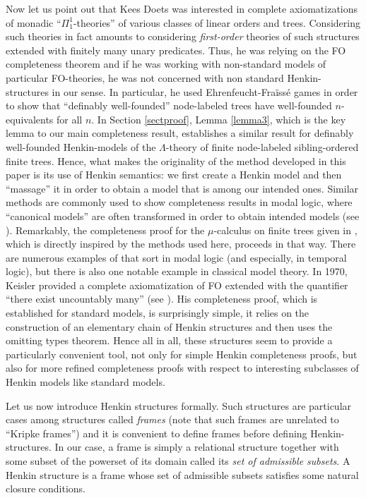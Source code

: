 \documentclass{LMCS}
\newcommand{\fo}{\textsf{FO}\xspace}
\begin{document}
Now let us point out that Kees Doets was interested in complete axiomatizations of monadic ``$\Pi_1^1$-theories'' of various classes of
linear orders and trees. Considering such theories in fact amounts to considering \emph{first-order} theories of such structures extended with finitely many unary predicates. Thus, he was relying on the \fo completeness theorem and if he was working with non-standard models of particular \fo-theories, he was not concerned with non standard Henkin-structures in our sense. In particular, he used Ehrenfeucht-Fra\"{i}ss\'{e} games in order to show that ``definably well-founded'' node-labeled trees have well-founded $n$-equivalents for all $n$. 
In Section \ref{sectproof}, Lemma \ref{lemma3}, which is the key lemma to our main completeness result, establishes a similar result for definably well-founded Henkin-models of the $\Lambda$-theory of finite node-labeled sibling-ordered finite trees. Hence, what makes the originality of the method developed in this paper is its use of Henkin semantics: we first create a Henkin model and then ``massage'' it in order to obtain a model that is among our intended ones. Similar methods are commonly used to show completeness results in modal logic, where ``canonical models'' are often transformed in order to obtain intended models (see \cite{modal}). Remarkably, the completeness proof for the $\mu$-calculus on finite trees given in \cite{DBLP:conf/fossacs/CateF10}, which is directly inspired by the methods used here, proceeds in that way. There are numerous examples of that sort in modal logic (and especially, in temporal logic), but there is also one notable example in classical model theory. In 
1970, Keisler provided a complete axiomatization of \fo extended with the quantifier ``there exist uncountably many'' (see \cite{keisler}). His completeness proof, which is established for standard models, is surprisingly simple, it relies on the construction of an elementary chain of Henkin structures and then uses the omitting types theorem. Hence all in all, these structures seem to provide a particularly convenient tool, not only for simple Henkin completeness proofs, but also for more refined completeness proofs with respect to interesting subclasses of Henkin models like standard models. 

Let us now introduce Henkin structures formally. Such structures are
particular cases among structures called \emph{frames} (note that such frames are unrelated to ``Kripke frames'') and it is convenient to define frames before defining Henkin-structures. In our case, a frame is simply a relational structure together with some subset of the powerset of its domain called its \emph{set of admissible subsets}. A Henkin structure is a frame whose set of admissible subsets satisfies some natural closure conditions.
\end{document}
